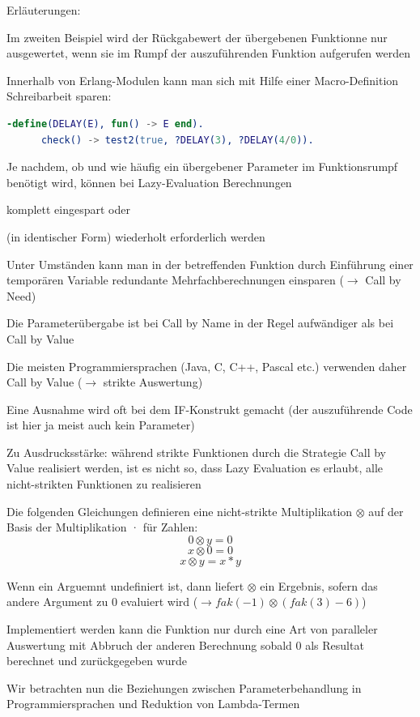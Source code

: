 \documentclass[10pt]{article}
\begin{document}
\begin{itemize*}
  \item Erläuterungen:
  \begin{itemize*}
    \item Im zweiten Beispiel wird der Rückgabewert der übergebenen Funktionne nur ausgewertet, wenn sie im Rumpf der auszuführenden Funktion aufgerufen werden
    \item Innerhalb von Erlang-Modulen kann man sich mit Hilfe einer Macro-Definition Schreibarbeit sparen:
    \begin{lstlisting}[language=erlang] 
      -define(DELAY(E), fun() -> E end).
      check() -> test2(true, ?DELAY(3), ?DELAY(4/0)).
    \end{lstlisting}
  \end{itemize*}
  \item Je nachdem, ob und wie häufig ein übergebener Parameter im Funktionsrumpf benötigt wird, können bei Lazy-Evaluation Berechnungen
  \begin{itemize*}
    \item komplett eingespart oder
    \item (in identischer Form) wiederholt erforderlich werden
    \item Unter Umständen kann man in der betreffenden Funktion durch Einführung einer temporären Variable redundante Mehrfachberechnungen einsparen ($\rightarrow$ Call by Need)
  \end{itemize*}
  \item Die Parameterübergabe ist bei Call by Name in der Regel aufwändiger als bei Call by Value
  \begin{itemize*}
    \item Die meisten Programmiersprachen (Java, C, C++, Pascal etc.) verwenden daher Call by Value ($\rightarrow$ strikte Auswertung)
    \item Eine Ausnahme wird oft bei dem IF-Konstrukt gemacht (der auszuführende Code ist hier ja meist auch kein Parameter)
  \end{itemize*}
  \item Zu Ausdrucksstärke: während strikte Funktionen durch die Strategie Call by Value realisiert werden, ist es nicht so, dass Lazy Evaluation es erlaubt, alle nicht-strikten Funktionen zu realisieren
  \begin{itemize*}
    \item Die folgenden Gleichungen definieren eine nicht-strikte Multiplikation $\otimes$ auf der Basis der Multiplikation · für Zahlen:
    $$0 \otimes y = 0$$
    $$x \otimes 0 = 0$$
    $$x \otimes y = x * y$$
    \item Wenn ein Arguemnt undefiniert ist, dann liefert $\otimes$ ein Ergebnis, sofern das andere Argument zu 0 evaluiert wird ($\rightarrow fak(-1) \otimes (fak(3)-6)$)
    \item Implementiert werden kann die Funktion nur durch eine Art von paralleler Auswertung mit Abbruch der anderen Berechnung sobald 0 als Resultat berechnet und zurückgegeben wurde
  \end{itemize*}
  \item Wir betrachten nun die Beziehungen zwischen Parameterbehandlung in Programmiersprachen und Reduktion von Lambda-Termen
\end{itemize*}
\end{document}
